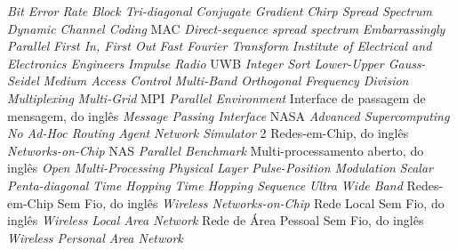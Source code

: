 \begin{acronym}
 {\textit{Bit Error Rate}}
 {\textit{Block Tri-diagonal}}
 {\textit{Conjugate Gradient}}
 {\textit{Chirp Spread Spectrum}}
 {\textit{Dynamic Channel Coding} MAC}
 {\textit{Direct-sequence spread spectrum}}
 {\textit{Embarrassingly Parallel}}
 {\textit{First In, First Out}}
 {\textit{Fast Fourier Transform}}
 {\textit{Institute of Electrical and Electronics Engineers}}
 {\textit{Impulse Radio} UWB}
 {\textit{Integer Sort}}
 {\textit{Lower-Upper Gauss-Seidel}}
 {\textit{Medium Access Control}}
 {\textit{Multi-Band Orthogonal Frequency Division Multiplexing}}
 {\textit{Multi-Grid}}
 {MPI \textit{Parallel Environment}}
 {Interface de passagem de mensagem, do inglês \textit{Message Passing Interface}}
 {NASA \textit{Advanced Supercomputing}}
 {\textit{No Ad-Hoc Routing Agent}} 
 {\textit{Network Simulator} 2}
 {Redes-em-Chip, do inglês \textit{Networks-on-Chip}}
 {NAS \textit{Parallel Benchmark}}
 {Multi-processamento aberto, do inglês \textit{Open Multi-Processing}}
 {\textit{Physical Layer}}
 {\textit{Pulse-Position Modulation}}
 {\textit{Scalar Penta-diagonal}}
 {\textit{Time Hopping}}
 {\textit{Time Hopping Sequence}}
 {\textit{Ultra Wide Band}}
 {Redes-em-Chip Sem Fio, do inglês \textit{Wireless Networks-on-Chip}}
 {Rede Local Sem Fio, do inglês \textit{Wireless Local Area Network}}
 {Rede de Área Pessoal Sem Fio, do inglês \textit{Wireless Personal Area Network}}
\end{acronym}